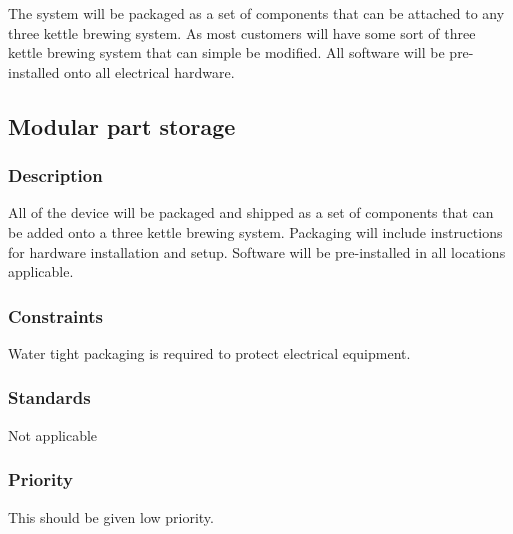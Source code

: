 The system will be packaged as a set of components that can be attached to any three kettle brewing system. As most customers will have some sort of three kettle brewing system that can simple be modified. All software will be pre-installed onto all electrical hardware.

\subsection{Modular part storage}
\subsubsection{Description}
All of the device will be packaged and shipped as a set of components that can be added onto a three kettle brewing system. Packaging will include instructions for hardware installation and setup. Software will be pre-installed in all locations applicable.
\subsubsection{Constraints}
Water tight packaging is required to protect electrical equipment. 
\subsubsection{Standards}
Not applicable
\subsubsection{Priority}
This should be given low priority.

